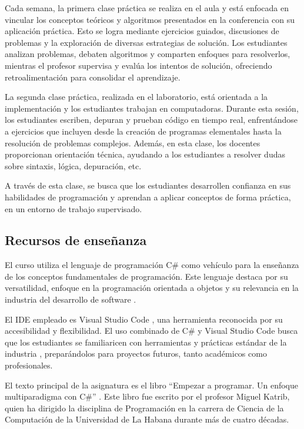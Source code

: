\documentclass{article}
\begin{document}
Cada semana, la primera clase práctica se realiza en el aula y está enfocada en vincular los conceptos teóricos y algoritmos presentados en la conferencia con su aplicación práctica. Esto se logra mediante ejercicios guiados, discusiones de problemas y la exploración de diversas estrategias de solución. Los estudiantes analizan problemas, debaten algoritmos y comparten enfoques para resolverlos, mientras el profesor supervisa y evalúa los intentos de solución, ofreciendo retroalimentación para consolidar el aprendizaje.

La segunda clase práctica, realizada en el laboratorio, está orientada a la implementación y los estudiantes trabajan en computadoras. Durante esta sesión, los estudiantes escriben, depuran y prueban código en tiempo real, enfrentándose a ejercicios que incluyen desde la creación de programas elementales hasta la resolución de problemas complejos. Además, en esta clase, los docentes proporcionan orientación técnica, ayudando a los estudiantes a resolver dudas sobre sintaxis, lógica, depuración, etc. 

A través de esta clase, se busca que los estudiantes desarrollen confianza en sus habilidades de programación y aprendan a aplicar conceptos de forma práctica, en un entorno de trabajo supervisado.\\


\subsection{Recursos de enseñanza}

El curso utiliza el lenguaje de programación C\# como vehículo para la enseñanza de los conceptos fundamentales de programación. Este lenguaje destaca por su versatilidad, enfoque en la programación orientada a objetos y su relevancia en la industria del desarrollo de software .

El IDE empleado es Visual Studio Code \agregaesto{[REF]}, una herramienta reconocida por su accesibilidad y flexibilidad. El uso combinado de C\# y Visual Studio Code busca que los estudiantes se familiaricen con herramientas y prácticas estándar de la industria \agregaesto{[REF]}, preparándolos para proyectos futuros, tanto académicos como profesionales.

El texto principal de la asignatura es el libro ``Empezar a programar. Un enfoque multiparadigma con C\#'' \cite{katrib_programar}. Este libro fue escrito por el profesor Miguel Katrib, quien ha dirigido la disciplina de Programación en la carrera de Ciencia de la Computación de la Universidad de La Habana durante más de cuatro décadas.  
\end{document}
